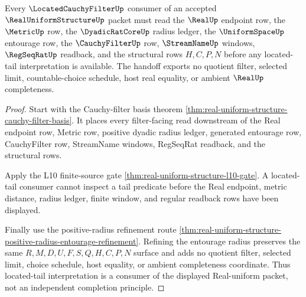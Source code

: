 \begin{theorem}
\label{thm:real-uniform-structure-located-cauchy-filter-handoff}
Every $\LocatedCauchyFilterUp$ consumer of an accepted $\RealUniformStructureUp$ packet must read the $\RealUp$ endpoint row, the $\MetricUp$ row, the $\DyadicRatCoreUp$ radius ledger, the $\UniformSpaceUp$ entourage row, the $\CauchyFilterUp$ row, $\StreamNameUp$ windows, $\RegSeqRatUp$ readback, and the structural rows $H,C,P,N$ before any located-tail interpretation is available. The handoff exports no quotient filter, selected limit, countable-choice schedule, host real equality, or ambient $\RealUp$ completeness.
\end{theorem}
\begin{proof}
Start with the Cauchy-filter basis theorem \autoref{thm:real-uniform-structure-cauchy-filter-basis}. It places every filter-facing read downstream of the Real endpoint row, Metric row, positive dyadic radius ledger, generated entourage row, CauchyFilter row, StreamName windows, RegSeqRat readback, and the structural rows.

Apply the L10 finite-source gate \autoref{thm:real-uniform-structure-l10-gate}. A located-tail consumer cannot inspect a tail predicate before the Real endpoint, metric distance, radius ledger, finite window, and regular readback rows have been displayed.

Finally use the positive-radius refinement route \autoref{thm:real-uniform-structure-positive-radius-entourage-refinement}. Refining the entourage radius preserves the same $R,M,D,U,F,S,Q,H,C,P,N$ surface and adds no quotient filter, selected limit, choice schedule, host equality, or ambient completeness coordinate. Thus located-tail interpretation is a consumer of the displayed Real-uniform packet, not an independent completion principle.
\end{proof}

